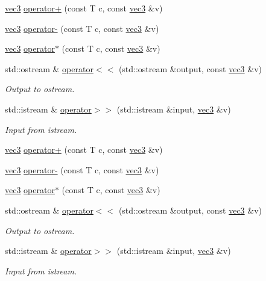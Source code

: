 \begin{DoxyCompactItemize}
\mbox{\hyperlink{struct_space_h_1_1vec3}{vec3}} \mbox{\hyperlink{struct_space_h_1_1vec3_a04165a00cae4ce5d2f5e142cc177a720}{operator+}} (const T c, const \mbox{\hyperlink{struct_space_h_1_1vec3}{vec3}} \&v)
\item 
\mbox{\hyperlink{struct_space_h_1_1vec3}{vec3}} \mbox{\hyperlink{struct_space_h_1_1vec3_a6252e85a538cca25b99107166be778b1}{operator-\/}} (const T c, const \mbox{\hyperlink{struct_space_h_1_1vec3}{vec3}} \&v)
\item 
\mbox{\hyperlink{struct_space_h_1_1vec3}{vec3}} \mbox{\hyperlink{struct_space_h_1_1vec3_a4f0b2685679a321b6c43a7406719c3a5}{operator$\ast$}} (const T c, const \mbox{\hyperlink{struct_space_h_1_1vec3}{vec3}} \&v)
\item 
std\+::ostream \& \mbox{\hyperlink{struct_space_h_1_1vec3_af5e1bcad9d3d484d6f4e6b3f8949f5cf}{operator$<$$<$}} (std\+::ostream \&output, const \mbox{\hyperlink{struct_space_h_1_1vec3}{vec3}} \&v)
\begin{DoxyCompactList}\small\item\em Output to ostream. \end{DoxyCompactList}\item 
std\+::istream \& \mbox{\hyperlink{struct_space_h_1_1vec3_a72f92578884bd68e0747871acd8545fd}{operator$>$$>$}} (std\+::istream \&input, \mbox{\hyperlink{struct_space_h_1_1vec3}{vec3}} \&v)
\begin{DoxyCompactList}\small\item\em Input from istream. \end{DoxyCompactList}\item 
\mbox{\hyperlink{struct_space_h_1_1vec3}{vec3}} \mbox{\hyperlink{struct_space_h_1_1vec3_a04165a00cae4ce5d2f5e142cc177a720}{operator+}} (const T c, const \mbox{\hyperlink{struct_space_h_1_1vec3}{vec3}} \&v)
\item 
\mbox{\hyperlink{struct_space_h_1_1vec3}{vec3}} \mbox{\hyperlink{struct_space_h_1_1vec3_a6252e85a538cca25b99107166be778b1}{operator-\/}} (const T c, const \mbox{\hyperlink{struct_space_h_1_1vec3}{vec3}} \&v)
\item 
\mbox{\hyperlink{struct_space_h_1_1vec3}{vec3}} \mbox{\hyperlink{struct_space_h_1_1vec3_a4f0b2685679a321b6c43a7406719c3a5}{operator$\ast$}} (const T c, const \mbox{\hyperlink{struct_space_h_1_1vec3}{vec3}} \&v)
\item 
std\+::ostream \& \mbox{\hyperlink{struct_space_h_1_1vec3_af5e1bcad9d3d484d6f4e6b3f8949f5cf}{operator$<$$<$}} (std\+::ostream \&output, const \mbox{\hyperlink{struct_space_h_1_1vec3}{vec3}} \&v)
\begin{DoxyCompactList}\small\item\em Output to ostream. \end{DoxyCompactList}\item 
std\+::istream \& \mbox{\hyperlink{struct_space_h_1_1vec3_a72f92578884bd68e0747871acd8545fd}{operator$>$$>$}} (std\+::istream \&input, \mbox{\hyperlink{struct_space_h_1_1vec3}{vec3}} \&v)
\begin{DoxyCompactList}\small\item\em Input from istream. \end{DoxyCompactList}\end{DoxyCompactItemize}


